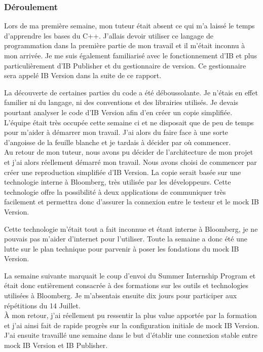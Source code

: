 \documentclass[11pt, oneside, titlepage, a4paper]{article}
\begin{document}
		\subsubsection{Déroulement}
Lors de ma première semaine, mon tuteur était absent ce qui m'a laissé le temps d'apprendre les bases du C++. J'allais devoir utiliser ce langage de programmation dans la première partie de mon travail et il m'était inconnu à mon arrivée. Je me suis également familiarisé avec le fonctionnement d'IB et plus particulièrement d'IB Publisher et du gestionnaire de version. Ce gestionnaire sera appelé IB Version dans la suite de ce rapport.

La découverte de certaines parties du code a été déboussolante. Je n'étais en effet familier ni du langage, ni des conventions et des librairies utilisés. Je devais pourtant analyser le code d'IB Version afin d'en créer un copie simplifiée. L'équipe était très occupée cette semaine ci et ne disposait que de peu de temps pour m'aider à démarrer mon travail. J'ai alors du faire face à une sorte d'angoisse de la feuille blanche et je tardais à décider par où commencer.
\\

Au retour de mon tuteur, nous avons pu décider de l'architecture de mon projet et j'ai alors réellement démarré mon travail. Nous avons choisi de commencer par créer une reproduction simplifiée d'IB Version. La copie serait basée sur une technologie interne à Bloomberg, très utilisée par les développeurs. Cette technologie offre la possibilité à deux applications de communiquer très facilement et permettra donc d'assurer la connexion entre le testeur et le mock IB Version.

Cette technologie m'était tout a fait inconnue et étant interne à Bloomberg, je ne pouvais pas m'aider d'internet pour l'utiliser. Toute la semaine a donc été une lutte sur le plan technique pour parvenir à poser les fondations du mock IB Version.

La semaine suivante marquait le coup d'envoi du Summer Internship Program et était donc entièrement consacrée à des formations sur les outils et technologies utilisées à Bloomberg. Je m'absentais ensuite dix jours pour participer aux répétitions du 14 Juillet.
\\

À mon retour, j'ai réellement pu ressentir la plus value apportée par la formation et j'ai ainsi fait de rapide progrès sur la configuration initiale de mock IB Version. J'ai ensuite travaillé une semaine dans le but d'établir une connexion stable entre mock IB Version et IB Publisher.
\end{document}
